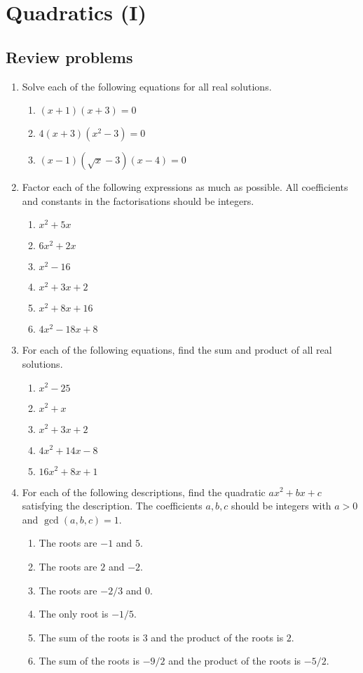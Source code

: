 \section{Quadratics (I)}

\subsection{Review problems}

\begin{enumerate}
\item Solve each of the following equations for all real solutions.
\begin{enumerate}
\item $(x + 1)(x + 3) = 0$
\item $4(x + 3)(x^2 - 3) = 0$
\item $(x - 1)(\sqrt{x} - 3)(x - 4) = 0$
\end{enumerate}
\item Factor each of the following expressions as much as possible. All coefficients and constants in the factorisations should be integers.
\begin{enumerate}
\item $x^2 + 5x$
\item $6x^2 + 2x$
\item $x^2 - 16$
\item $x^2 + 3x + 2$
\item $x^2 + 8x + 16$
\item $4x^2 - 18x + 8$
\end{enumerate}
\item For each of the following equations, find the sum and product of all real solutions.
\begin{enumerate}
\item $x^2 - 25$
\item $x^2 + x$
\item $x^2 + 3x + 2$
\item $4x^2 + 14x - 8$
\item $16x^2 + 8x + 1$
\end{enumerate} 
\item For each of the following descriptions, find the quadratic $ax^2 + bx + c$ satisfying the description. The coefficients $a,b,c$ should be integers with $a > 0$ and $\gcd(a,b,c) = 1$.
\begin{enumerate}
\item The roots are $-1$ and $5$.
\item The roots are $2$ and $-2$.
\item The roots are $-2/3$ and $0$.
\item The only root is $-1/5$.
\item The sum of the roots is $3$ and the product of the roots is $2$.
\item The sum of the roots is $-9/2$ and the product of the roots is $-5/2$.
\end{enumerate}
\end{enumerate}


